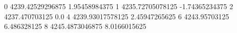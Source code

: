 0 4239.42529296875 1.95458984375
1 4235.72705078125 -1.74365234375
2 4237.470703125 0.0
4 4239.93017578125 2.45947265625
6 4243.95703125 6.486328125
8 4245.4873046875 8.0166015625
